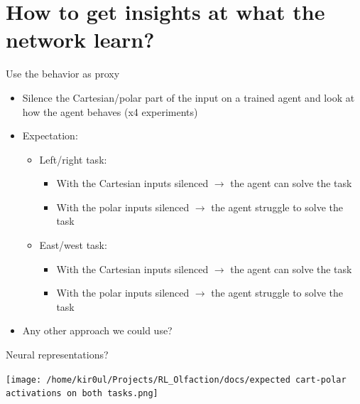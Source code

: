 \documentclass[bigger]{beamer}
\begin{document}
\section{How to get insights at what the network learn?}
\label{sec:org3dc8f04}
\begin{frame}[<+->][label={sec:orgdca0656}]{Use the behavior as proxy}
\begin{itemize}
\item Silence the Cartesian/polar part of the input on a trained agent and look at how the agent behaves (x4 experiments)
\item Expectation:
\begin{itemize}
\item Left/right task:
\begin{itemize}
\item With the Cartesian inputs silenced \(\to\) the agent can solve the task
\item With the polar inputs silenced \(\to\) the agent struggle to solve the task
\end{itemize}
\item East/west task:
\begin{itemize}
\item With the Cartesian inputs silenced \(\to\) the agent can solve the task
\item With the polar inputs silenced \(\to\) the agent struggle to solve the task
\end{itemize}
\end{itemize}
\item Any other approach we could use?
\end{itemize}
\end{frame}
\begin{frame}[label={sec:org73f9e02}]{Neural representations?}
\begin{center}
\texttt{[image: /home/kir0ul/Projects/RL\_Olfaction/docs/expected cart-polar activations on both tasks.png]}
\end{center}
\end{frame}
\end{document}
